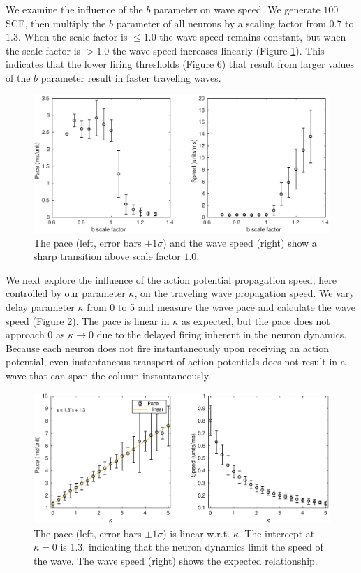 We examine the influence of the $b$ parameter on wave speed.
We generate $100$ SCE, then multiply the $b$ parameter of all neurons by a scaling factor from $0.7$ to $1.3$.
When the scale factor is $\leq 1.0$ the wave speed remains constant, but when the scale factor is $>1.0$ the wave speed increases linearly (Figure \ref{fig:WaveSpeed_B}).
This indicates that the lower firing thresholds (Figure 6) that result from larger values of the $b$ parameter result in faster traveling waves.

\begin{figure}[!htb]
 \centering
   \includegraphics[width=\textwidth]{fig/WaveSpeed_B}
   \caption{The pace (left, error bars $\pm 1 \sigma$) and the wave speed (right) show a sharp transition above scale factor $1.0$. }
   \label{fig:WaveSpeed_B}
\end{figure}

\FloatBarrier

We next explore the influence of the action potential propagation speed, here controlled by our parameter $\kappa$, on the traveling wave propagation speed.
We vary delay parameter $\kappa$ from 0 to 5 and measure the wave pace and calculate the wave speed (Figure \ref{fig:delay_speed}).
The pace is linear in $\kappa$ as expected, but the pace does not approach $0$ as $\kappa \rightarrow 0$ due to the delayed firing inherent in the neuron dynamics.
Because each neuron does not fire instantaneously upon receiving an action potential, even instantaneous transport of action potentials does not result in a wave that can span the column instantaneously.
\begin{figure}[!htb]
 \centering
   \includegraphics[width=\textwidth]{fig/WaveSpeed_Delay}
   \caption{The pace (left, error bars $\pm 1 \sigma$) is linear w.r.t. $\kappa$. The intercept at $\kappa=0$ is 1.3, indicating that the neuron dynamics limit the speed of the wave. 
	  The wave speed (right) shows the expected relationship. }
    \label{fig:delay_speed}
\end{figure}
\FloatBarrier

